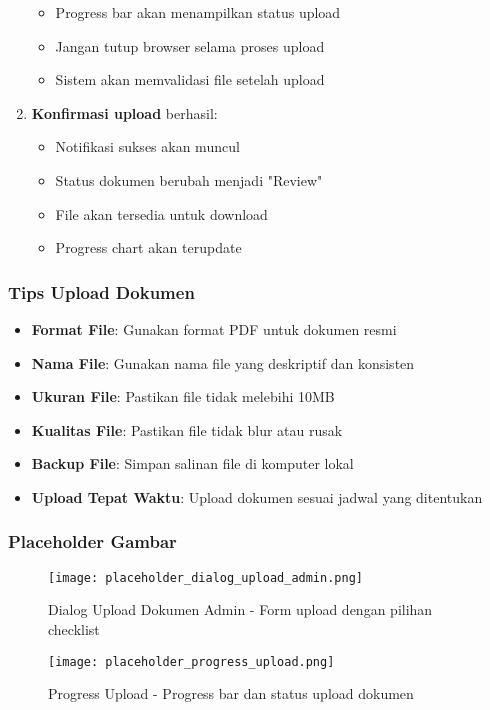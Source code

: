 \documentclass[12pt,a4paper]{article}
\begin{document}
\begin{enumerate}
\begin{itemize}
\item Progress bar akan menampilkan status upload
\item Jangan tutup browser selama proses upload
\item Sistem akan memvalidasi file setelah upload
\end{itemize}
\item \textbf{Konfirmasi upload} berhasil:
\begin{itemize}
\item Notifikasi sukses akan muncul
\item Status dokumen berubah menjadi "Review"
\item File akan tersedia untuk download
\item Progress chart akan terupdate
\end{itemize}
\end{enumerate}

\subsubsection{Tips Upload Dokumen}
\begin{itemize}
\item \textbf{Format File}: Gunakan format PDF untuk dokumen resmi
\item \textbf{Nama File}: Gunakan nama file yang deskriptif dan konsisten
\item \textbf{Ukuran File}: Pastikan file tidak melebihi 10MB
\item \textbf{Kualitas File}: Pastikan file tidak blur atau rusak
\item \textbf{Backup File}: Simpan salinan file di komputer lokal
\item \textbf{Upload Tepat Waktu}: Upload dokumen sesuai jadwal yang ditentukan
\end{itemize}

\subsubsection{Placeholder Gambar}
\begin{figure}[H]
\centering
\texttt{[image: placeholder\_dialog\_upload\_admin.png]}
\caption{Dialog Upload Dokumen Admin - Form upload dengan pilihan checklist}
\label{fig:dialog_upload_admin}
\end{figure}

\begin{figure}[H]
\centering
\texttt{[image: placeholder\_progress\_upload.png]}
\caption{Progress Upload - Progress bar dan status upload dokumen}
\label{fig:progress_upload}
\end{figure}
\end{document}
